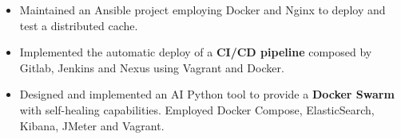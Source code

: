 \documentclass[10pt,a4paper]{altacv}
\begin{document}
\divider

\begin{itemize}
\item Maintained an Ansible project employing Docker and Nginx to deploy and test a distributed cache.
\item Implemented the automatic deploy of a \textbf{CI/CD pipeline} composed by Gitlab, Jenkins and Nexus using Vagrant and Docker.
\item Designed and implemented an AI Python tool to provide a \textbf{Docker Swarm} with self-healing capabilities. Employed Docker Compose, ElasticSearch, Kibana, JMeter and Vagrant.
\end{itemize}




\nocite{*}

\printbibliography[heading=pubtype,title={\printinfo{\faBook}{Dissertations}},type=book]
\end{document}
